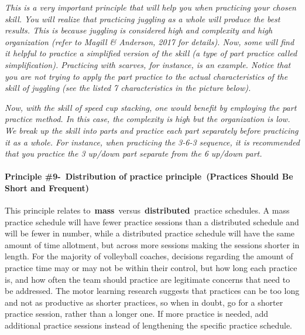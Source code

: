 \documentclass[
  letterpaper,
  DIV=11,
  numbers=noendperiod]{scrartcl}
\let\oldparagraph\paragraph
\renewcommand{\paragraph}[1]{\oldparagraph{#1}\mbox{}}
\begin{document}
\emph{This is a very important principle that will help you when
practicing your chosen skill. You will realize that practicing juggling
as a whole will produce the best results. This is because juggling is
considered high and complexity and high organization (refer to Magill \&
Anderson, 2017 for details). Now, some will find it helpful to practice
a simplified version of the skill (a type of part practice called
simplification). Practicing with scarves, for instance, is an example.
Notice that you are not trying to apply the part practice to the actual
characteristics of the skill of juggling (see the listed 7
characteristics in the picture below).}

\emph{Now, with the skill of speed cup stacking, one would benefit by
employing the part practice method. In this case, the complexity is high
but the organization is low. We break up the skill into parts and
practice each part separately before practicing it as a whole. For
instance, when practicing the 3-6-3 sequence, it is recommended that you
practice the 3 up/down part separate from the 6 up/down part.}

\hypertarget{principle-9--distribution-of-practice-principle-practices-should-be-short-and-frequent}{%
\paragraph{\texorpdfstring{\textbf{Principle \#9-~Distribution of
practice principle~(Practices Should Be Short and
Frequent)}}{Principle \#9-~Distribution of practice principle~(Practices Should Be Short and Frequent)}}\label{principle-9--distribution-of-practice-principle-practices-should-be-short-and-frequent}}

This principle relates
to~\textbf{mass}~versus~\textbf{distributed}~practice schedules. A mass
practice schedule will have fewer practice sessions than a distributed
schedule and will be fewer in number, while a distributed practice
schedule will have the same amount of time allotment, but across more
sessions making the sessions shorter in length. For the majority of
volleyball coaches, decisions regarding the amount of practice time may
or may not be within their control, but how long each practice is, and
how often the team should practice are legitimate concerns that need to
be addressed. The motor learning research suggests that practices can be
too long and not as productive as shorter practices, so when in doubt,
go for a shorter practice session, rather than a longer one. If more
practice is needed, add additional practice sessions instead of
lengthening the specific practice schedule.
\end{document}
